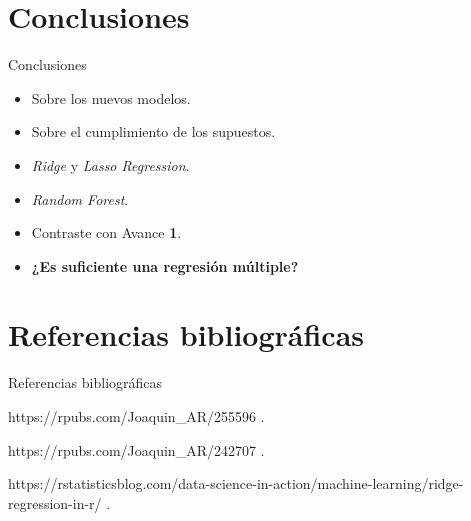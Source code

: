 \documentclass[11pt]{beamer}\usepackage{knitr}
\begin{document}
\section{Conclusiones}

\begin{frame}{Conclusiones}
	\begin{itemize}
		\item Sobre los nuevos modelos.
		\pause
		\item Sobre el cumplimiento de los supuestos.
		\pause
		\item \textit{Ridge} y \textit{Lasso Regression}.
		\pause
		\item \textit{Random Forest}.
		\pause
		\item Contraste con Avance \textbf{1}.
		\pause
		\item \textbf{¿Es suficiente una regresión múltiple?}
	\end{itemize}
\end{frame}


\section{Referencias bibliográficas}

\begin{frame}{Referencias bibliográficas}
	\begin{thebibliography}{10}

		\beamertemplateonlinebibitems %
		https://rpubs.com/Joaquin\_AR/255596
		.

		\beamertemplateonlinebibitems %
		https://rpubs.com/Joaquin\_AR/242707
		.

		\beamertemplateonlinebibitems %
		https://rstatisticsblog.com/data-science-in-action/machine-learning/ridge-regression-in-r/
		.


	\end{thebibliography}
\end{frame}
\end{document}
